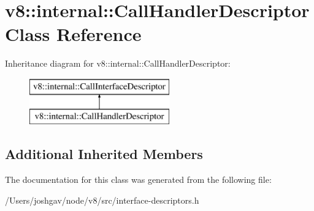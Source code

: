 \hypertarget{classv8_1_1internal_1_1_call_handler_descriptor}{}\section{v8\+:\+:internal\+:\+:Call\+Handler\+Descriptor Class Reference}
\label{classv8_1_1internal_1_1_call_handler_descriptor}
Inheritance diagram for v8\+:\+:internal\+:\+:Call\+Handler\+Descriptor\+:\begin{figure}[H]
\begin{center}
\leavevmode
\includegraphics[height=2.000000cm]{classv8_1_1internal_1_1_call_handler_descriptor}
\end{center}
\end{figure}
\subsection*{Additional Inherited Members}


The documentation for this class was generated from the following file\+:\begin{DoxyCompactItemize}
\item 
/\+Users/joshgav/node/v8/src/interface-\/descriptors.\+h\end{DoxyCompactItemize}

